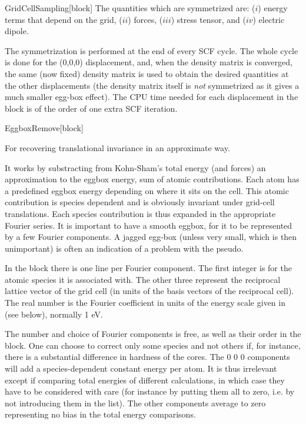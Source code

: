 \begin{fdfentry}{GridCellSampling}[block]
  The quantities which are symmetrized are: ($i$) energy terms that
  depend on the grid, ($ii$) forces, ($iii$) stress tensor, and ($iv$)
  electric dipole.

  The symmetrization is performed at the end of every SCF cycle. The
  whole cycle is done for the (0,0,0) displacement, and, when the
  density matrix is converged, the same (now fixed) density matrix is
  used to obtain the desired quantities at the other displacements
  (the density matrix itself is \emph{not} symmetrized as it gives a
  much smaller egg-box effect). The CPU time needed for each
  displacement in the  block is of the order
  of one extra SCF iteration.

\end{fdfentry}

\begin{fdfentry}{EggboxRemove}[block]

  For recovering translational invariance in an approximate way.

  It works by substracting from Kohn-Sham's total energy (and forces)
  an approximation to the eggbox energy, sum of atomic contributions.
  Each atom has a predefined eggbox energy depending on where it sits
  on the cell. This atomic contribution is species dependent and is
  obviously invariant under grid-cell translations. Each species
  contribution is thus expanded in the appropriate Fourier series.  It
  is important to have a smooth eggbox, for it to be represented by a
  few Fourier components. A jagged egg-box (unless very small, which
  is then unimportant) is often an indication of a problem with the
  pseudo.

  In the block there is one line per Fourier component. The first
  integer is for the atomic species it is associated with. The other
  three represent the reciprocal lattice vector of the grid cell (in
  units of the basis vectors of the reciprocal cell). The real number
  is the Fourier coefficient in units of the energy scale given in
   (see below), normally 1 eV.

  The number and choice of Fourier components is free, as well as
  their order in the block. One can choose to correct only some
  species and not others if, for instance, there is a substantial
  difference in hardness of the cores. The 0 0 0 components will add a
  species-dependent constant energy per atom. It is thus irrelevant
  except if comparing total energies of different calculations, in
  which case they have to be considered with care (for instance by
  putting them all to zero, i.e. by not introducing them in the list).
  The other components average to zero representing no bias in the
  total energy comparisons.


\end{fdfentry}
